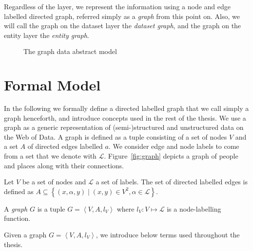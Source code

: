 Regardless of the layer, we represent the information using a node and edge labelled directed graph, referred simply as a \emph{graph} from this point on. Also, we will call the graph on the dataset layer the \emph{dataset graph}, and the graph on the entity layer the \emph{entity graph}.

\begin{figure}
	\centering
	\resizebox{.8\textwidth}{!}{
		
	}
	\caption{The graph data abstract model}
	\label{fig:gdm}
\end{figure}

\section{Formal Model}
\label{sec:gdm:formal-model}

In the following we formally define a directed labelled graph that we call simply a graph henceforth, and introduce concepts used in the rest of the thesis. We use a graph as a generic representation of (semi-)structured and unstructured data on the Web of Data. A graph is defined as a tuple consisting of a set of nodes $V$ and a set $A$ of directed edges labelled $a$. We consider edge and node labels to come from a set that we denote with $\mathcal{L}$. Figure~\ref{fig:graph} depicts a graph of people and places along with their connections.

\begin{definition}[Graph]
	Let $V$ be a set of nodes and $\mathcal{L}$ a set of labels. The set of directed labelled edges is defined as $A \subseteq \left\lbrace (x, \alpha, y) \mid (x, y) \in V^2, \alpha \in \mathcal{L} \right\rbrace$.

	A \emph{graph} $G$ is a tuple $G = \left\langle V, A, l_V \right\rangle$ where $l_V : V \mapsto \mathcal{L}$ is a node-labelling function.
\end{definition}

Given a graph $G = \left\langle V, A, l_V \right\rangle$, we introduce below terms used throughout the thesis.

